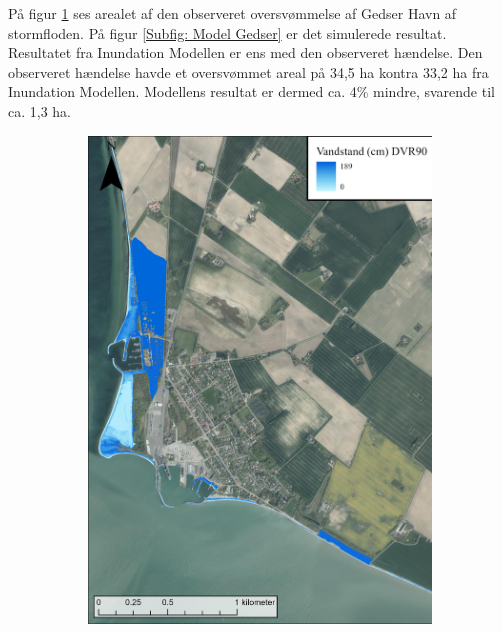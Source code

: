 På figur \ref{Subfig: Målt Gedser} ses arealet af den observeret oversvømmelse af Gedser Havn af stormfloden. På figur \ref{Subfig: Model Gedser} er det simulerede resultat. Resultatet fra Inundation Modellen er ens med den observeret hændelse. Den observeret hændelse havde et oversvømmet areal på 34,5 ha kontra 33,2 ha fra Inundation Modellen. Modellens resultat er dermed ca. 4\% mindre, svarende til ca. 1,3 ha.  

\begin{figure}[H]
    \begin{subfigure}[t]{0.5\textwidth}
        \centering
        \includegraphics[width=0.95\linewidth]{images/Resultater/2023Malt/2023 resultat_gedser.jpg}
        \caption{}
        \label{Subfig: Målt Gedser}
    \end{subfigure}
    \begin{subfigure}[t]{0.5\textwidth}
        \centering

\end{subfigure}
\end{figure}
